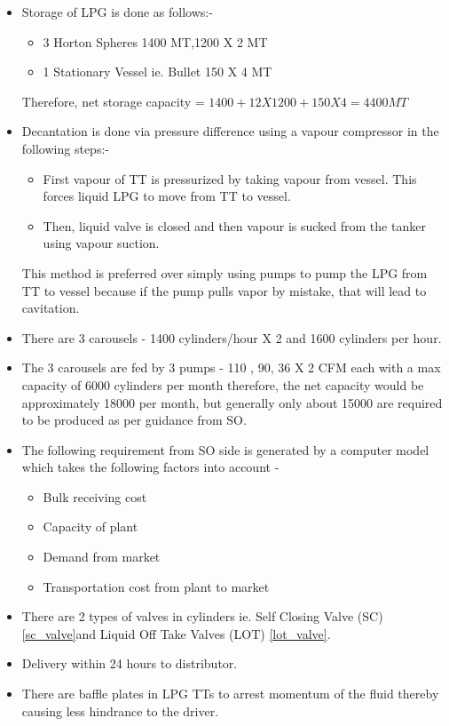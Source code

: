 \documentclass{report}
\begin{document}
\begin{itemize}
		\item Storage of LPG is done as follows:-
		\begin{itemize}
			\item 3 Horton Spheres 1400 MT,1200 X 2 MT
			\item 1 Stationary Vessel ie. Bullet 150 X 4 MT
		\end{itemize}
		Therefore, net storage capacity = $1400+12 X 1200+150X4 = 4400 MT$
		\item Decantation is done via pressure difference using a vapour compressor in the following steps:-
		\begin{itemize}
			\item First vapour of TT is pressurized by taking vapour from vessel. This forces liquid LPG to move from TT to vessel.
			\item Then, liquid valve is closed and then vapour is sucked from the tanker using vapour suction.
		\end{itemize}
		This method is preferred over simply using pumps to pump the LPG from TT to vessel because if the pump pulls vapor by mistake, that will lead to cavitation.
		\item There are 3 carousels - 1400 cylinders/hour X 2 and 1600 cylinders per hour.
		\item The 3 carousels are fed by 3 pumps - 110 , 90, 36 X 2 CFM each with a max capacity of 6000 cylinders per month therefore, the net capacity would be approximately 18000 per month, but generally only about 15000 are required to be produced as per guidance from SO.
		\item The following requirement from SO side is generated by a computer model which takes the following factors into account -
		\begin{itemize}
			\item Bulk receiving cost
			\item Capacity of plant
			\item Demand from market
			\item Transportation cost from plant to market
		\end{itemize}
		\item There are 2 types of valves in cylinders ie. Self Closing Valve (SC) \ref{sc_valve}and Liquid Off Take Valves (LOT) \ref{lot_valve}.
		\item Delivery within 24 hours to distributor.
		\item There are baffle plates in LPG TTs to arrest momentum of the fluid thereby causing less hindrance to the driver.
	\end{itemize}
\end{document}
